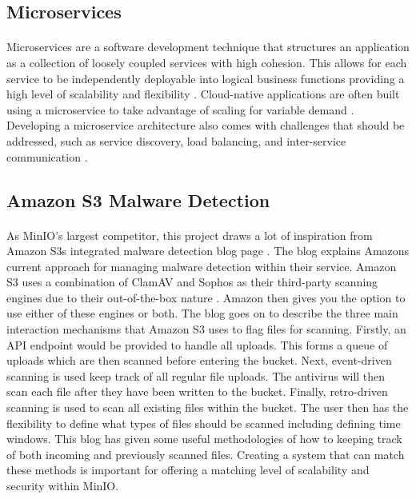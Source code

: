 \documentclass[12pt, conference, final, a4paper, onecolumn, compsoc]{IEEEtran}
\begin{document}
\subsection{Microservices} %
\paragraph{}

Microservices are a software development technique that structures an
application as a collection of loosely coupled services with high cohesion. This
allows for each service to be independently deployable into logical business
functions providing a high level of scalability and flexibility
\citep{microservice}. Cloud-native applications are often built using a
microservice to take advantage of scaling for variable demand
\citep{microservice}. Developing a microservice architecture also comes with
challenges that should be addressed, such as service discovery, load balancing,
and inter-service communication \citep{microservice}.


\subsection{Amazon S3 Malware Detection} %
\paragraph{}

As MinIO's largest competitor, this project draws a lot of inspiration from
Amazon S3s integrated malware detection blog page \citep{amazon-md}. The blog
explains Amazons current approach for managing malware detection within their
service. Amazon S3 uses a combination of ClamAV and Sophos as their third-party
scanning engines due to their out-of-the-box nature \citep{amazon-md}. Amazon then gives you the
option to use either of these engines or both. The blog goes on to describe the
three main interaction mechanisms that Amazon S3 uses to flag files for
scanning. Firstly, an API endpoint would be provided to handle all uploads. This
forms a queue of uploads which are then scanned before entering the bucket.
Next, event-driven scanning is used keep track of all regular file uploads. The
antivirus will then scan each file after they have been written to the bucket.
Finally, retro-driven scanning is used to scan all existing files within the
bucket. The user then has the flexibility to define what types of files should
be scanned including defining time windows. This blog has given some useful
methodologies of how to keeping track of both incoming and previously scanned
files. Creating a system that can match these methods is important for offering
a matching level of scalability and security within MinIO.
\end{document}
